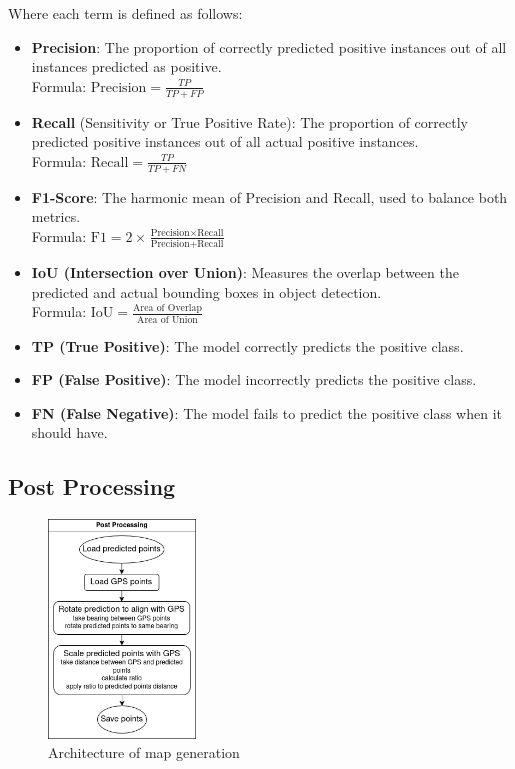 \documentclass[final]{cmpreport_02}
\begin{document}
Where each term is defined as follows:
\begin{itemize}
    \item \textbf{Precision}: The proportion of correctly predicted positive instances out of all instances predicted as positive.\\
    Formula: $\displaystyle \text{Precision} = \frac{TP}{TP + FP}$

    \item \textbf{Recall} (Sensitivity or True Positive Rate): The proportion of correctly predicted positive instances out of all actual positive instances.\\
    Formula: $\displaystyle \text{Recall} = \frac{TP}{TP + FN}$

    \item \textbf{F1-Score}: The harmonic mean of Precision and Recall, used to balance both metrics.\\
    Formula: $\displaystyle \text{F1} = 2 \times \frac{\text{Precision} \times \text{Recall}}{\text{Precision} + \text{Recall}}$

    \item \textbf{IoU (Intersection over Union)}: Measures the overlap between the predicted and actual bounding boxes in object detection.\\
    Formula: $\displaystyle \text{IoU} = \frac{\text{Area of Overlap}}{\text{Area of Union}}$

    \item \textbf{TP (True Positive)}: The model correctly predicts the positive class.

    \item \textbf{FP (False Positive)}: The model incorrectly predicts the positive class.

    \item \textbf{FN (False Negative)}: The model fails to predict the positive class when it should have.
\end{itemize}


\subsection{Post Processing}

\begin{figure}[H]
	\centering
	\includegraphics[width=0.35\textwidth]{./images/postProcessing.drawio.png}
	\caption{Architecture of map generation}
	\label{PPr:arch}
\end{figure}
\end{document}
